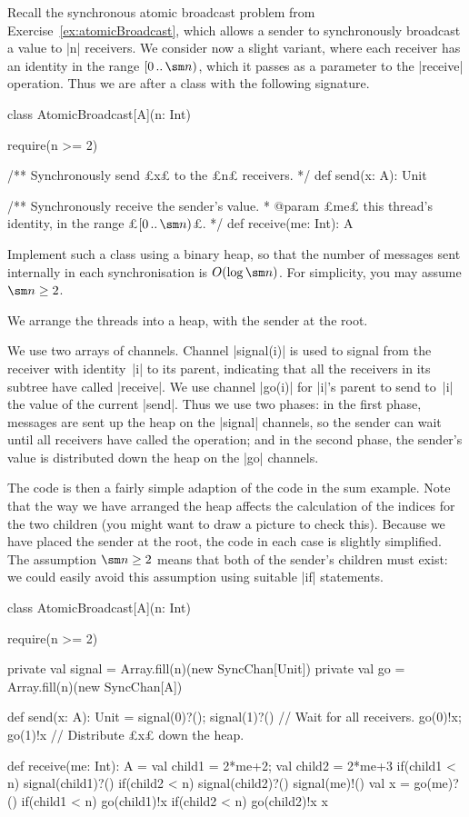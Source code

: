 \begin{questionS}
Recall the synchronous atomic broadcast problem from
Exercise~\ref{ex:atomicBroadcast}, which allows a sender to synchronously
broadcast a value to |n| receivers.  We consider now a slight variant, where
each receiver has an identity in the range $\interval{0}{\sm n}$, which it
passes as a parameter to the |receive| operation.  Thus we are after a class
with the following signature.
%
\begin{scala}
class AtomicBroadcast[A](n: Int){
  require(n >= 2)

  /** Synchronously send £x£ to the £n£ receivers. */
  def send(x: A): Unit

  /** Synchronously receive the sender's value.
    * @param £me£ this thread's identity, in the range £$\interval{0}{\sm n}$£. */
  def receive(me: Int): A 
}
\end{scala}
%
Implement such a class using a binary heap, so that the number of messages
sent internally in each synchronisation is $O(\log \sm n)$.  For simplicity,
you may assume $\sm n \ge 2$. 
\end{questionS}


\begin{answerS}
We arrange the threads into a heap, with the sender at the root. 

We use two arrays of channels.  Channel |signal(i)| is used to signal from the
receiver with identity~|i| to its parent, indicating that all the receivers in
its subtree have called |receive|.  We use channel |go(i)| for |i|'s parent to
send to~|i| the value of the current |send|.  Thus we use two phases: in the
first phase, messages are sent up the heap on the |signal| channels, so the
sender can wait until all receivers have called the operation; and in the
second phase, the sender's value is distributed down the heap on the |go|
channels. 

The code is then a fairly simple adaption of the code in the sum example.
Note that the way we have arranged the heap affects the calculation of the
indices for the two children (you might want to draw a picture to check this).
Because we have placed the sender at the root, the code in each case is
slightly simplified.  The assumption $\sm n \ge 2$ means that both of the
sender's children must exist: we could easily avoid this assumption using
suitable |if| statements.
%
\begin{scala}
class AtomicBroadcast[A](n: Int){
  require(n >= 2)

  private val signal = Array.fill(n)(new SyncChan[Unit])
  private val go = Array.fill(n)(new SyncChan[A])

  def send(x: A): Unit = {
    signal(0)?(); signal(1)?() // Wait for all receivers.
    go(0)!x; go(1)!x // Distribute £x£ down the heap. 
  }

  def receive(me: Int): A = {
    val child1 = 2*me+2; val child2 = 2*me+3
    if(child1 < n) signal(child1)?()
    if(child2 < n) signal(child2)?()
    signal(me)!()
    val x = go(me)?()
    if(child1 < n) go(child1)!x
    if(child2 < n) go(child2)!x
    x
  }
}
\end{scala}
\end{answerS}
